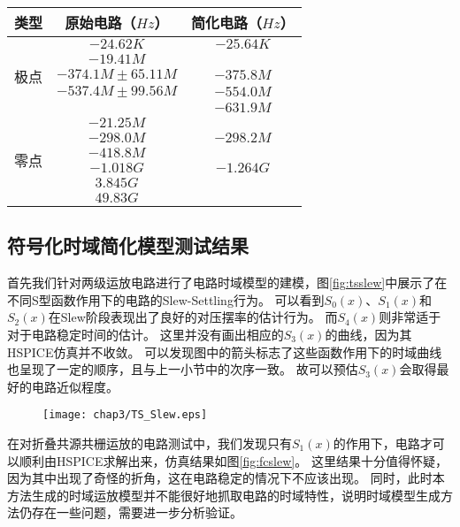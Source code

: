 \begin{table}[!htbp]
	\centering
	\begin{tabular}{c|c|c}
		\hline
		类型 & 原始电路（$Hz$） & 简化电路（$Hz$） \\
		\hline
		\multirow{5}{*}{极点} 
		& $-24.62K$  & $-25.64K$ \\
		& $-19.41M$ &  \\
		& $-374.1M \pm 65.11M$ & $-375.8M$ \\
		& $-537.4M \pm 99.56M$ & $-554.0M$ \\
		&  & $-631.9M$ \\
		\hline
		\multirow{6}{*}{零点} 
		& $-21.25M$ & \\ 
		& $-298.0M$ & $-298.2M$ \\
		& $-418.8M$ & \\
		& $-1.018G$ & $-1.264G$ \\
		& $3.845G$ & \\
		& $49.83G$ & \\
		\hline					
	\end{tabular}
\end{table}

\subsection{符号化时域简化模型测试结果}

首先我们针对两级运放电路进行了电路时域模型的建模，图\ref{fig:tsslew}中展示了在不同S型函数作用下的电路的Slew-Settling行为。
可以看到$S_0\left(x\right)$、$S_1\left(x\right)$和$S_2\left(x\right)$在Slew阶段表现出了良好的对压摆率的估计行为。
而$S_4\left(x\right)$则非常适于对于电路稳定时间的估计。
这里并没有画出相应的$S_3\left(x\right)$的曲线，因为其HSPICE仿真并不收敛。
可以发现图中的箭头标志了这些函数作用下的时域曲线也呈现了一定的顺序，且与上一小节中的次序一致。
故可以预估$S_3\left(x\right)$会取得最好的电路近似程度。

\begin{figure}[!htp]
	\centering
	\texttt{[image: chap3/TS\_Slew.eps]}
\end{figure}

在对折叠共源共栅运放的电路测试中，我们发现只有$S_1\left(x\right)$的作用下，电路才可以顺利由HSPICE求解出来，仿真结果如图\ref{fig:fcslew}。
这里结果十分值得怀疑，因为其中出现了奇怪的折角，这在电路稳定的情况下不应该出现。
同时，此时本方法生成的时域运放模型并不能很好地抓取电路的时域特性，说明时域模型生成方法仍存在一些问题，需要进一步分析验证。

